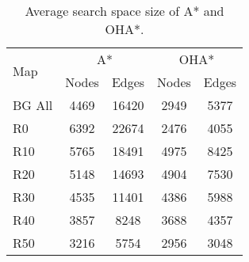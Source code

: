 \begin{table}
  \caption{Average search space size of A* and OHA*.}
	\vspace{-2em}
  \label{table-graphsize}
  \centering
  \begin{tabular}{lcccc}
   \hline
  \multirow{2}{*}{Map} & \multicolumn{2}{c}{A*} & \multicolumn{2}{c}{OHA*} \\
	\cline{2-3}
	\cline{4-5}
	& Nodes & Edges & Nodes & Edges \\
\hline
BG All &  4469 & 16420 & 2949 &  5377 \\
R0 & 6392 & 22674 & 2476 & 4055 \\
R10 & 5765 & 18491 & 4975 & 8425 \\
R20 & 5148 & 14693  & 4904 & 7530 \\ 
R30 & 4535 & 11401 & 4386 & 5988 \\
R40 & 3857 & 8248 & 3688 & 4357 \\
R50 & 3216 & 5754 & 2956 & 3048 \\ 
   \hline
\end{tabular}
\end{table}

